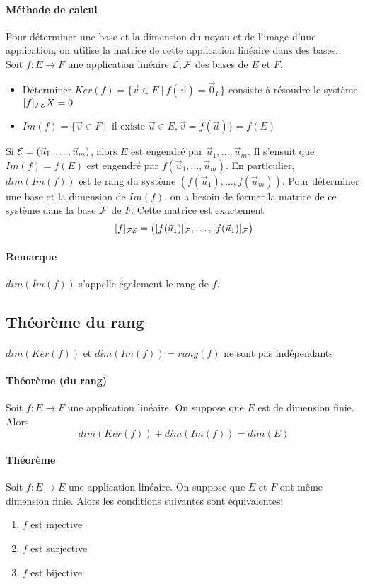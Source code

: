 \paragraph{Méthode de calcul} Pour déterminer une base et la dimension du noyau et de l'image d'une application, on utilise la matrice de cette application linéaire dans des bases. \\
Soit $f: E \rightarrow F$ une application linéaire $\mathcal{E}, \mathcal{F}$ des bases de $E$ et $F$.
\begin{itemize}
  \item Déterminer $Ker(f) = \{\vec{v} \in E ~ \vert ~ f(\vec{v}) = \vec{0}_F \}$ consiste à résoudre le système $[f]_{\mathcal{F} \mathcal{E}} X = 0$
  \item $Im(f) = \{ \vec{v} \in F ~ \vert ~ \text{ il existe } \vec{u} \in E, \vec{v} = f(\vec{u}) \} = f(E)$
\end{itemize}
Si $\mathcal{E} = (\vec{u}_1, \ldots, \vec{u}_m)$, alors $E$ est engendré par $\vec{u}_1, \ldots, \vec{u}_m$. Il s'ensuit que $Im(f) = f(E)$ est engendré par $f(\vec{u}_1, \ldots, \vec{u}_m)$. En particulier, $dim(Im(f))$ est le rang du système $(f(\vec{u}_1), \ldots, f(\vec{u}_m))$. Pour déterminer une base et la dimension de $Im(f)$, on a besoin de former la matrice de ce système dans la base $\mathcal{F}$ de $F$. Cette matrice est exactement 
$$[f]_{\mathcal{F} \mathcal{E}} = \big([f(\vec{u}_1)]_{\mathcal{F}}, \ldots, [f(\vec{u}_1)]_{\mathcal{F}}\big)$$

\paragraph{Remarque} $dim(Im(f))$ s'appelle également le rang de $f$.

%
\subsection{Théorème du rang}
%
\paragraph{} $dim(Ker(f))$ et $dim(Im(f)) = rang(f)$ ne sont pas indépendants
\paragraph{Théorème (du rang)} Soit $f: E \rightarrow F$ une application linéaire. On suppose que $E$ est de dimension finie. Alors
$$dim(Ker(f)) + dim(Im(f)) = dim(E)$$

\paragraph{Théorème} Soit $f: E \rightarrow E$ une application linéaire. On suppose que $E$ et $F$ ont même dimension finie. Alors les conditions suivantes sont équivalentes:
\begin{enumerate}
  \item $f$ est injective 
  \item $f$ est surjective
  \item $f$ est bijective
\end{enumerate}

